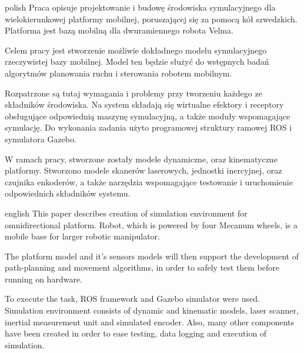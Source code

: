  \begin{abstractpage}
	\begin{abstractsection}{polish}
		Praca opisuje projektowanie i budowę środowiska symulacyjnego dla wielokierunkowej platformy mobilnej, poruszającej się za pomocą kół szwedzkich.
		Platforma jest bazą mobilną dla dwuramiennego robota Velma. 
		
		Celem pracy jest stworzenie możliwie dokładnego modelu symulacyjnego rzeczywistej bazy mobilnej.
		Model ten będzie służyć do wstępnych badań algorytmów planowania ruchu i sterowania robotem mobilnym.

		Rozpatrzone są tutaj wymagania i problemy przy tworzeniu każdego ze składników środowiska.
		Na system składają się wirtualne efektory i receptory obsługujące odpowiednią maszynę symulacyjną, a także moduły wspomagające symulację.
		Do wykonania zadania użyto programowej struktury ramowej ROS i symulatora Gazebo.
		
		W ramach pracy, stworzone zostały modele dynamiczne, oraz kinematyczne platformy.
		Stworzono modele skanerów laserowych, jednostki inercyjnej, oraz czujnika enkoderów, a także narzędzia wspomagające testowanie i uruchomienie odpowiednich składników systemu.
	\end{abstractsection}

	\begin{abstractsection}{english}
		This paper describes creation of simulation environment for omnidirectional platform.
		Robot, which is powered by four Mecanum wheels, is a mobile base for larger robotic manipulator.
		
		The platform model and it's sensors models will then support the development of path-planning and movement algorithms, in order to safely test them before running on
		hardware.
		
		To execute the task, ROS framework and Gazebo simulator were used.
		Simulation environment consists of dynamic and kinematic models, laser scanner, inertial measurement unit and simulated encoder. 
		Also, many other components have been created in order to ease testing, data logging and execution of simulation.
	\end{abstractsection}
\end{abstractpage}
